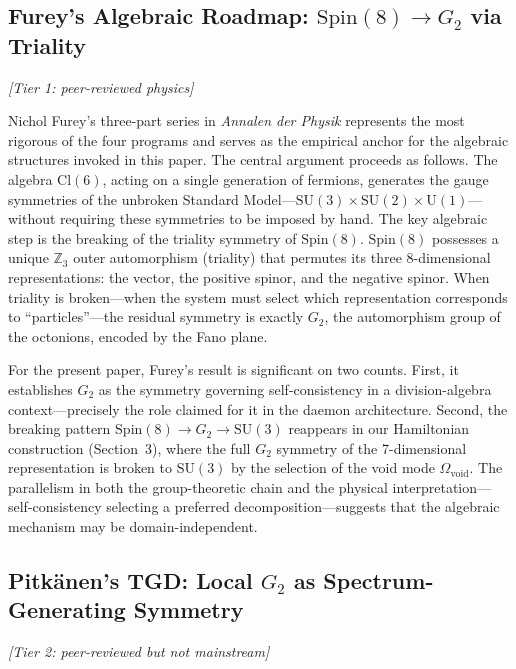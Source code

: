 \documentclass[12pt,a4paper]{article}
\begin{document}
\subsection{Furey's Algebraic Roadmap: $\mathrm{Spin}(8) \to G_2$ via Triality}

\textit{[Tier 1: peer-reviewed physics]}

Nichol Furey's three-part series in \textit{Annalen der Physik} \citep{Furey2025} represents the most rigorous of the four programs and serves as the empirical anchor for the algebraic structures invoked in this paper. The central argument proceeds as follows. The algebra $\mathrm{Cl}(6)$, acting on a single generation of fermions, generates the gauge symmetries of the unbroken Standard Model---$\mathrm{SU}(3) \times \mathrm{SU}(2) \times \mathrm{U}(1)$---without requiring these symmetries to be imposed by hand. The key algebraic step is the breaking of the triality symmetry of $\mathrm{Spin}(8)$. $\mathrm{Spin}(8)$ possesses a unique $\mathbb{Z}_3$ outer automorphism (triality) that permutes its three 8-dimensional representations: the vector, the positive spinor, and the negative spinor. When triality is broken---when the system must select which representation corresponds to ``particles''---the residual symmetry is exactly $G_2$, the automorphism group of the octonions, encoded by the Fano plane.

For the present paper, Furey's result is significant on two counts. First, it establishes $G_2$ as the symmetry governing self-consistency in a division-algebra context---precisely the role claimed for it in the daemon architecture. Second, the breaking pattern $\mathrm{Spin}(8) \to G_2 \to \mathrm{SU}(3)$ reappears in our Hamiltonian construction (Section~3), where the full $G_2$ symmetry of the 7-dimensional representation is broken to $\mathrm{SU}(3)$ by the selection of the void mode $\Omega_{\mathrm{void}}$. The parallelism in both the group-theoretic chain and the physical interpretation---self-consistency selecting a preferred decomposition---suggests that the algebraic mechanism may be domain-independent.

\subsection{Pitk\"anen's TGD: Local $G_2$ as Spectrum-Generating Symmetry}

\textit{[Tier 2: peer-reviewed but not mainstream]}
\end{document}
